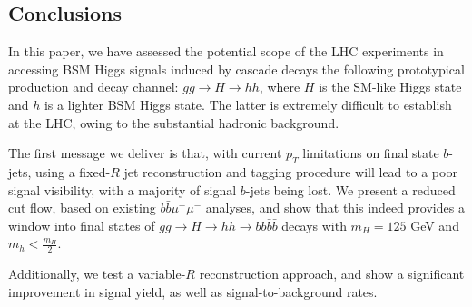 \begin{table}[!h]
\begin{center}
\caption{\label{tab:signalbackground5} Final $\Sigma$ values calculated for signal and backgrounds for ${\cal L}=300$ fb$^{-1}$  upon enforcing the reduced cuts plus the mass selection criteria $|m_{bbbb}-m_H|< 20$ GeV and $|m_{bb} - m_h|< 15$ GeV for the various jet reconstruction procedures.}
\end{center}
\end{table}

\subsection{Conclusions}
In this paper, we have assessed the potential scope of the LHC
experiments in accessing BSM Higgs signals induced by cascade decays
the following prototypical production and decay channel: $gg\to H\to
hh$, where $H$ is the SM-like Higgs state and $h$ is a lighter BSM
Higgs state.
The latter is extremely difficult to establish at the LHC,
owing to the substantial hadronic background.

The first message we deliver is that, with current $p_T$ limitations on final state $b$-jets, using a fixed-$R$ jet reconstruction and tagging procedure will lead to a poor signal visibility, with a majority of signal $b$-jets being lost. We present a reduced cut flow, based on existing $b\bar b\mu^+\mu^-$ analyses, and show that this indeed provides a window into final states of $gg \rightarrow H \rightarrow hh \rightarrow bb\bar{b}\bar{b}$ decays with $m_H = 125$ GeV and $m_h < \frac{m_H}{2}$. 

Additionally, we test a variable-$R$ reconstruction approach, and show a significant improvement in signal yield, as well as signal-to-background rates.

